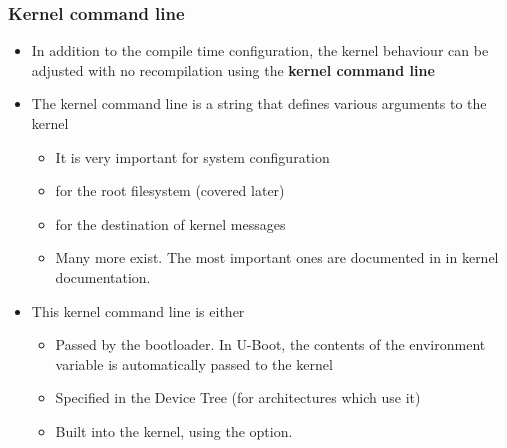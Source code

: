 \begin{frame}
  \frametitle{Kernel command line}
  \begin{itemize}
  \item In addition to the compile time configuration, the kernel
    behaviour can be adjusted with no recompilation using the {\bf
      kernel command line}
  \item The kernel command line is a string that defines various
    arguments to the kernel
    \begin{itemize}
    \item It is very important for system configuration
    \item {} for the root filesystem (covered later)
    \item {} for the destination of kernel messages
    \item Many more exist. The most important ones are documented
          in  in kernel
          documentation.
    \end{itemize}
  \item This kernel command line is either
    \begin{itemize}
    \item Passed by the bootloader. In U-Boot, the contents of the
       environment variable is automatically passed to the
      kernel
    \item Specified in the Device Tree (for architectures which use it)
    \item Built into the kernel, using the  option.
    \end{itemize}
  \end{itemize}
\end{frame}
